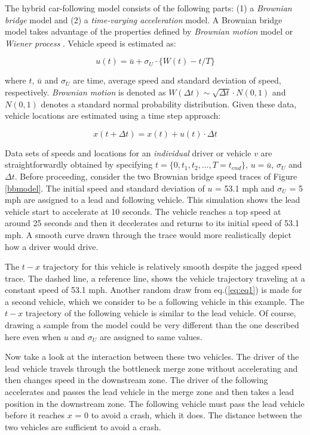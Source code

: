 \documentclass[Proceedings]{ascelike}
\begin{document}
The  hybrid car-following model consists of the following parts: (1)  a \emph{Brownian bridge} model and (2) a \emph{time-varying acceleration} model. A Brownian bridge model  takes advantage of the properties defined by \emph{Brownian motion} model or  \emph{Wiener process} \cite{iacus}. Vehicle speed is estimated as:

\begin {equation}
u(t)  = \bar{u} + \sigma_U \cdot \big\{ W(t) - t/T \big\} \label{eq:eq1}
\end{equation}

\noindent where $t$, $\bar{u}$ and $\sigma_U$ are time, average speed and standard deviation of speed, respectively. \emph{Brownian motion} is denoted as $W(\Delta t) \sim \sqrt{\Delta t} \cdot N(0,1)$ and $N(0,1)$ denotes a standard normal probability distribution.  Given these data, vehicle locations are estimated using a time step approach:

\begin {equation}
x(t + \Delta t)  = x(t) + u(t) \cdot \Delta t  \label{eq:eq2}
\end{equation}

Data sets of speeds and locations for an \emph{individual} driver or vehicle $v$ are straightforwardly obtained by specifying $t = \{0,t_1,t_2,\ldots,T = t_{end}\}$, $u = \bar{u}$, $\sigma_U$ and $\Delta t$. Before proceeding, consider the two Brownian bridge speed traces of Figure \ref{bbmodel}.  The initial speed  and standard deviation  of $u$ = 53.1 mph and $\sigma_U$ = 5 mph are assigned to a lead and following vehicle. This simulation shows the lead vehicle start to accelerate at 10 seconds. The vehicle reaches a top speed at around 25 seconds and then it decelerates and returns to its initial speed of 53.1 mph.  A smooth curve drawn through the trace would more realistically depict how a driver would drive. 

The $t-x$ trajectory for this vehicle is relatively smooth despite the jagged  speed trace. The dashed line, a reference line, shows the vehicle trajectory  traveling at a constant speed of 53.1 mph. Another random draw from eq.(\ref{eq:eq1}) is made for a second vehicle, which we consider to be a following vehicle in this example. The $t-x$ trajectory of the following vehicle is similar to the lead vehicle. Of course, drawing a sample from the model could  be very different than the one described here even when $u$ and  $\sigma_U$  are assigned to same values.
 
Now take a look at the interaction between these two vehicles. The driver of the lead vehicle travels through the bottleneck merge zone without accelerating and then changes speed in the downstream zone. The driver of the following accelerates and passes the lead vehicle in the merge zone and then takes a lead position in the downstream zone. The following vehicle must pass the lead vehicle before it reaches $x$ = 0 to avoid a crash, which it does. The distance between the two vehicles are sufficient to avoid a crash. 
\end{document}
